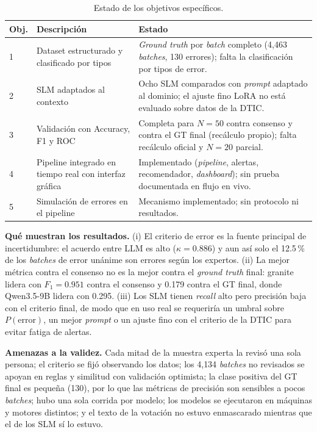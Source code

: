 \begin{table}[H]
\centering
\caption{Estado de los objetivos específicos.}
\label{tab:res_objetivos}
\small
\begin{tabular}{@{}p{0.6cm}p{5.2cm}p{8.2cm}@{}}
\toprule
\textbf{Obj.} & \textbf{Descripción} & \textbf{Estado} \\
\midrule
1 & Dataset estructurado y clasificado por tipos & \textit{Ground truth} por \textit{batch} completo (4{,}463 \textit{batches}, 130 errores); falta la clasificación por tipos de error. \\
2 & SLM adaptados al contexto & Ocho SLM comparados con \textit{prompt} adaptado al dominio; el ajuste fino LoRA no está evaluado sobre datos de la DTIC. \\
3 & Validación con Accuracy, F1 y ROC & Completa para $N=50$ contra consenso y contra el GT final (recálculo propio); falta recálculo oficial y $N=20$ parcial. \\
4 & Pipeline integrado en tiempo real con interfaz gráfica & Implementado (\textit{pipeline}, alertas, recomendador, \textit{dashboard}); sin prueba documentada en flujo en vivo. \\
5 & Simulación de errores en el pipeline & Mecanismo implementado; sin protocolo ni resultados. \\
\bottomrule
\end{tabular}
\normalsize
\end{table}

\textbf{Qué muestran los resultados.} (i) El criterio de error es la fuente principal de incertidumbre: el acuerdo entre LLM es alto ($\kappa=0.886$) y aun así solo el 12.5\,\% de los \textit{batches} de error unánime son errores según los expertos. (ii) La mejor métrica contra el consenso no es la mejor contra el \textit{ground truth} final: granite lidera con $F_1=0.951$ contra el consenso y 0.179 contra el GT final, donde Qwen3.5-9B lidera con 0.295. (iii) Los SLM tienen \textit{recall} alto pero precisión baja con el criterio final, de modo que en uso real se requeriría un umbral sobre $P(\text{error})$, un mejor \textit{prompt} o un ajuste fino con el criterio de la DTIC para evitar fatiga de alertas. %

\textbf{Amenazas a la validez.} Cada mitad de la muestra experta la revisó una sola persona; el criterio se fijó observando los datos; los 4{,}134 \textit{batches} no revisados se apoyan en reglas y similitud con validación optimista; la clase positiva del GT final es pequeña (130), por lo que las métricas de precisión son sensibles a pocos \textit{batches}; hubo una sola corrida por modelo; los modelos se ejecutaron en máquinas y motores distintos; y el texto de la votación no estuvo enmascarado mientras que el de los SLM sí lo estuvo. %
